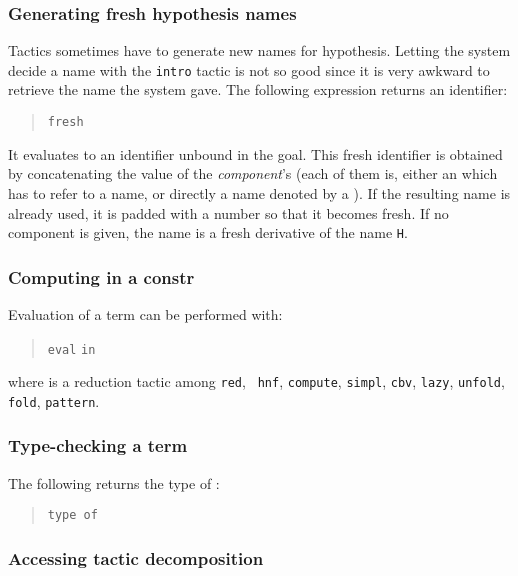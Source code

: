 \subsubsection[Generating fresh hypothesis names]{Generating fresh hypothesis names
}

Tactics sometimes have to generate new names for hypothesis. Letting
the system decide a name with the {\tt intro} tactic is not so good
since it is very awkward to retrieve the name the system gave.
The following expression returns an identifier:
\begin{quote}
{\tt fresh} 
\end{quote}
It evaluates to an identifier unbound in the goal. This fresh
identifier is obtained by concatenating the value of the
\textrm{\textsl{component}}'s (each of them is, either an {\ident} which
has to refer to a name, or directly a name denoted by a
{\qstring}). If the resulting name is already used, it is padded
with a number so that it becomes fresh. If no component is
given, the name is a fresh derivative of the name {\tt H}.

\subsubsection[Computing in a constr]{Computing in a constr
}

Evaluation of a term can be performed with:
\begin{quote}
{\tt eval} {} {\tt in} {\term}
\end{quote}
where  is a reduction tactic among {\tt red}, {\tt
hnf}, {\tt compute}, {\tt simpl}, {\tt cbv}, {\tt lazy}, {\tt unfold},
{\tt fold}, {\tt pattern}.

\subsubsection{Type-checking a term}

The following returns the type of {\term}:

\begin{quote}
{\tt type of} {\term}
\end{quote}

\subsubsection[Accessing tactic decomposition]{Accessing tactic decomposition
}

